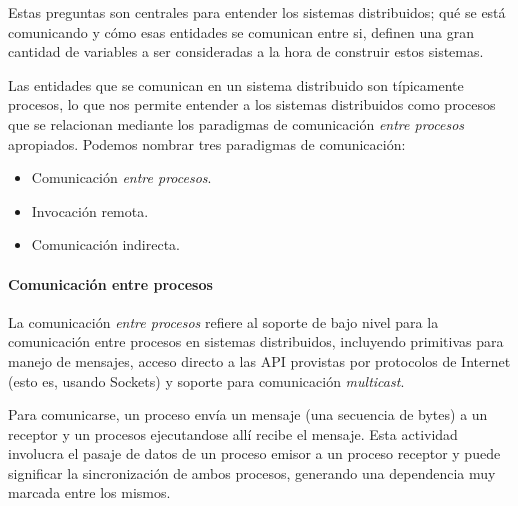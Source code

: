 \documentclass[a4paper,10pt, oneside]{article}
\begin{document}
Estas preguntas son centrales para entender los sistemas distribuidos; qué se está comunicando y cómo esas entidades se comunican entre si, definen una gran cantidad de variables a ser consideradas a la hora de construir estos sistemas.

Las entidades que se comunican en un sistema distribuido son típicamente procesos, lo que nos permite entender a los sistemas distribuidos como procesos que se relacionan mediante los paradigmas de comunicación \textit{entre procesos} apropiados. Podemos nombrar tres paradigmas de comunicación:

\begin{itemize}
	\item Comunicación \textit{entre procesos}.
	\item Invocación remota.
	\item Comunicación indirecta.
\end{itemize}

\paragraph{Comunicación entre procesos}
La comunicación \textit{entre procesos} refiere al soporte de bajo nivel para la comunicación entre procesos en sistemas distribuidos, incluyendo primitivas para manejo de mensajes, acceso directo a las API provistas por protocolos de Internet (esto es, usando Sockets) y soporte para comunicación \textit{multicast}.

Para comunicarse, un proceso envía un mensaje (una secuencia de bytes) a un receptor y un procesos ejecutandose allí recibe el mensaje. Esta actividad involucra el pasaje de datos de un proceso emisor a un proceso receptor y puede significar la sincronización de ambos procesos, generando una dependencia muy marcada entre los mismos.
\end{document}
